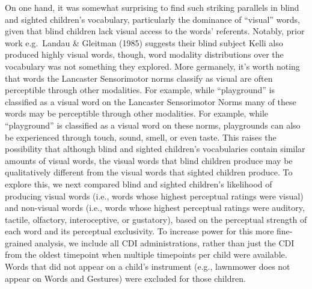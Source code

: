 \documentclass[
  man,floatsintext]{apa6}
\begin{document}
On one hand, it was somewhat surprising to find such striking parallels in blind and sighted children's vocabulary, particularly the dominance of ``visual'' words, given that blind children lack visual access to the words' referents. Notably, prior work e.g.~Landau \& Gleitman (1985) suggests their blind subject Kelli also produced highly visual words, though, word modality distributions over the vocabulary was not something they explored. More germanely, it's worth noting that words the Lancaster Sensorimotor norms classify as visual are often perceptible through other modalities. For example, while ``playground'' is classified as a visual word on the Lancaster Sensorimotor Norms many of these words may be perceptible through other modalities. For example, while ``playground'' is classified as a visual word on these norms, playgrounds can also be experienced through touch, sound, smell, or even taste. This raises the possibility that although blind and sighted children's vocabularies contain similar amounts of visual words, the visual words that blind children produce may be qualitatively different from the visual words that sighted children produce. To explore this, we next compared blind and sighted children's likelihood of producing visual words (i.e., words whose highest perceptual ratings were visual) and non-visual words (i.e., words whose highest perceptual ratings were auditory, tactile, olfactory, interoceptive, or gustatory), based on the perceptual strength of each word and its perceptual exclusivity. To increase power for this more fine-grained analysis, we include all CDI administrations, rather than just the CDI from the oldest timepoint when multiple timepoints per child were available. Words that did not appear on a child's instrument (e.g., lawnmower does not appear on Words and Gestures) were excluded for those children.
\end{document}
